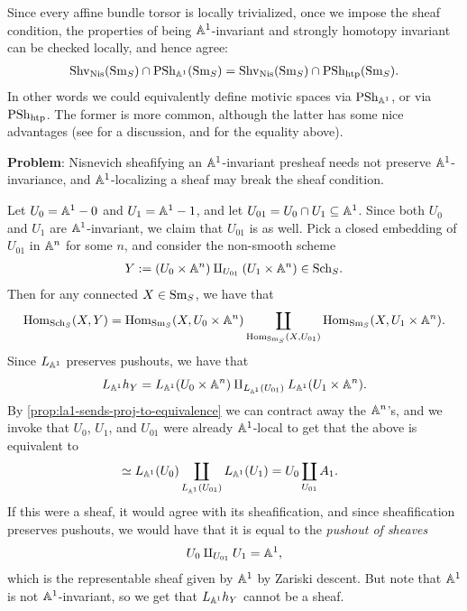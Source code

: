 \documentclass[11pt,openany]{book}
\renewcommand{\Pre}{\mathrm{PSh}}
\begin{document}
\begin{remark} Since every affine bundle torsor is locally trivialized, once we impose the sheaf condition, the properties of being $\mathbb{A}^1$-invariant and strongly homotopy invariant can be checked locally, and hence agree:
\begin{align*}
    \mathrm{Shv}_{\mathrm{Nis}}(\mathrm{Sm}_S) \cap \mathrm{PSh}_{\mathbb{A}^1}(\mathrm{Sm}_S) = \mathrm{Shv}_{\mathrm{Nis}}(\mathrm{Sm}_S) \cap \mathrm{PSh}_{\mathrm{htp}}(\mathrm{Sm}_S).
\end{align*}
In other words we could equivalently define motivic spaces via $\Pre_{\A^1}$, or via $\Pre_\htp$. The former is more common, although the latter has some nice advantages (see \cite[p.~204]{Hoyois6} for a discussion, and \cite[3.13]{Hoyois6} for the equality above).
\end{remark}


 
\textbf{Problem}: Nisnevich sheafifying an $\mathbb{A}^1$-invariant presheaf needs not preserve $\mathbb{A}^1$-invariance, and $\mathbb{A}^1$-localizing a sheaf may break the sheaf condition. 

\begin{example} \cite[3.2.7]{MV} Let $U_0 = \mathbb{A}^1-0$ and $U_1 = \mathbb{A}^1-1$, and let $U_{01} = U_0 \cap U_1 \subseteq \mathbb{A}^1$. Since both $U_0$ and $U_1$ are $\mathbb{A}^1$-invariant, we claim that $U_{01}$ is as well. Pick a closed embedding of $U_{01}$ in $\mathbb{A}^n$ for some $n$, and consider the non-smooth scheme
\begin{align*}
    Y:=(U_0 \times \mathbb{A}^n) \amalg_{U_{01}} (U_1 \times \mathbb{A}^n) \in \mathrm{Sch}_S.
\end{align*}
Then for any connected $X\in \mathrm{Sm}_S$, we have that
\begin{align*}
    \mathrm{Hom}_{\mathrm{Sch}_S}(X,Y) = \mathrm{Hom}_{\mathrm{Sm}_S}(X, U_0 \times \mathbb{A}^n) \coprod_{\mathrm{Hom}_{\mathrm{Sm}_S}(X,U_{01})} \mathrm{Hom}_{\mathrm{Sm}_S}(X, U_1 \times \mathbb{A}^n).
\end{align*}
%
Since $L_{\mathbb{A}^1}$ preserves pushouts, we have that
\begin{align*}
    L_{\mathbb{A}^1} h_Y = L_{\mathbb{A}^1}(U_0 \times\mathbb{A}^n) \amalg_{L_{\mathbb{A}^1}(U_{01})} L_{\mathbb{A}^1}(U_1 \times \mathbb{A}^n).
\end{align*}
By \autoref{prop:la1-sends-proj-to-equivalence} we can contract away the $\mathbb{A}^n$'s, and we invoke that $U_0$, $U_1$, and $U_{01}$ were already $\mathbb{A}^1$-local to get that the above is equivalent to
\begin{align*}
    &\simeq L_{\mathbb{A}^1}(U_0) \coprod_{L_{\mathbb{A}^1}(U_{01})} L_{\mathbb{A}^1}(U_1) = U_0 \coprod_{U_{01}} A_1.
\end{align*}
If this were a sheaf, it would agree with its sheafification, and since sheafification preserves pushouts, we would have that it is equal to the \textit{pushout of sheaves}
\begin{align*}
    U_0 \amalg_{U_{01}} U_1 = \mathbb{A}^1,
\end{align*}
which is the representable sheaf given by $\mathbb{A}^1$ by Zariski descent. But note that $\mathbb{A}^1$ is not $\mathbb{A}^1$-invariant, so we get that $L_{\mathbb{A}^1}h_Y$ cannot be a sheaf.
\end{example}
\end{document}
